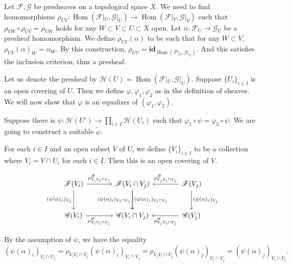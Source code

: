 \documentclass{article}
\DeclareMathOperator{\Hom}{Hom}
\begin{document}
\par Let $\mathcal{F},\mathcal{G}$ be presheaves on a topological space $X$. We need to find homomorphisms $\rho_{UV}:\Hom(\mathcal{F}|_U,\mathcal{G}|_U)\to\Hom(\mathcal{F}|_V,\mathcal{G}|_V)$ such that $\rho_{VW}\circ\rho_{UV}=\rho_{UW}$ holds
for any $W\subset V\subset U\subset X$ open. Let $\alpha:\mathcal{F}_U\to\mathcal{G}_U$ be a presheaf homomorphism. We define $\rho_{UV}(\alpha)$ to be such that for any $W\subset V$, $\rho_{UV}(\alpha)_W = \alpha_W$. By this construction, $\rho_{UU}=\mathbf{id}_{\Hom(\mathcal{F}|_U,\mathcal{G}|_U)}$. And this satisfies the inclusion criterion, thus a presheaf. 
\\
\par Let us denote the presheaf by $\mathcal{H}(U) = \Hom(\mathcal{F}|_U,\mathcal{G}|_U)$. Suppose $\{U_i\}_{i\in I}$ is an open covering of $U$. Then we define $\varphi,\varphi_1,\varphi_2$ as in the definition of sheaves. We will now show that $\varphi$ is an equalizer of $(\varphi_1,\varphi_2)$. \\
\par Suppose there is $\psi:\mathcal{H}(U')\to\prod_{i\in I}\mathcal{H}(U_i)$ such that $\varphi_1\circ\psi = \varphi_2\circ\psi$. We are going to construct a suitable $\tilde{\psi}$.\\

\par For each $i\in I$ and an open subset $V$ of $U$, we define $\{V_i\}_{i\in I}$ to be a collection where $V_i=V\cap U_i$ for each $i\in I$. Then this is an open covering of $V$. 

\[ \begin{tikzcd}[row sep=large, column sep=large]
\mathcal{F}(V_i) \arrow{r}{\rho^{\mathcal{F}}_{V_iV_i\cap V_j}} \arrow[swap]{d}{(\psi(\alpha)_j)_{V_j}} & \mathcal{F}(V_i\cap V_j) \arrow{d}[swap]{(\psi(\alpha)_i)_{V_i\cap V_j}} \arrow{d}{(\psi(\alpha)_j)_{V_i\cap V_j}}&\arrow{l}[swap]{\rho^{\mathcal{F}}_{V_jV_i\cap V_j}} \mathcal{F}(V_j)\arrow{d}{(\psi(\alpha)_j)_{V_j}}\\%
\mathcal{G}(V_i) \arrow{r}[swap]{\rho^{\mathcal{G}}_{V_iV_i\cap V_j}} & \mathcal{G}(V_i\cap V_j)&\arrow{l}{\rho^{\mathcal{G}}_{V_jV_i\cap V_j}} \mathcal{G}(V_j)
\end{tikzcd}
\]

By the assumption of $\psi$, we have the equality
\begin{equation*}
(\psi(\alpha)_i)_{V_i\cap U_j} = \rho_{V_iV_i\cap V_j}(\psi(\alpha)_i)_{V_i\cap V_j}=\rho_{V_jV_i\cap V_j}(\psi(\alpha)_j)_{V_i\cap V_j}=(\psi(\alpha)_j)_{V_i\cap V_j}.
\end{equation*}
\end{document}

